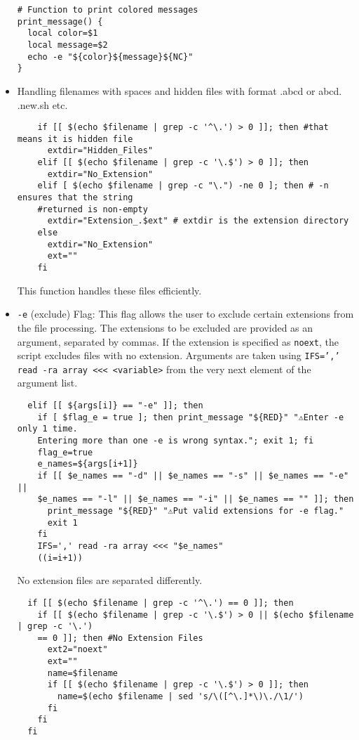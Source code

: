 \documentclass{article}
\begin{document}
\begin{itemize}
\begin{verbatim}
# Function to print colored messages
print_message() {
  local color=$1
  local message=$2
  echo -e "${color}${message}${NC}"
}
  \end{verbatim}
  \item Handling filenames with spaces and hidden files with format .abcd or abcd. .new.sh etc.
    \begin{verbatim}
    if [[ $(echo $filename | grep -c '^\.') > 0 ]]; then #that means it is hidden file
      extdir="Hidden_Files"
    elif [[ $(echo $filename | grep -c '\.$') > 0 ]]; then
      extdir="No_Extension"
    elif [ $(echo $filename | grep -c "\.") -ne 0 ]; then # -n ensures that the string
    #returned is non-empty
      extdir="Extension_.$ext" # extdir is the extension directory
    else
      extdir="No_Extension"
      ext=""
    fi
  \end{verbatim}
  This function handles these files efficiently.
  \item \texttt{-e} (exclude) Flag: This flag allows the user to exclude certain extensions from the file processing. The extensions to be excluded are provided as an argument, separated by commas. If the extension is specified as \texttt{noext}, the script excludes files with no extension.
  Arguments are taken using \texttt{IFS=',' read -ra array <<< <variable>} from the very next element of the argument list.
  \begin{verbatim}
  elif [[ ${args[i]} == "-e" ]]; then
    if [ $flag_e = true ]; then print_message "${RED}" "⚠️Enter -e only 1 time.
    Entering more than one -e is wrong syntax."; exit 1; fi
    flag_e=true
    e_names=${args[i+1]}
    if [[ $e_names == "-d" || $e_names == "-s" || $e_names == "-e" ||
    $e_names == "-l" || $e_names == "-i" || $e_names == "" ]]; then
      print_message "${RED}" "⚠️Put valid extensions for -e flag."
      exit 1
    fi
    IFS=',' read -ra array <<< "$e_names"
    ((i=i+1))
  \end{verbatim}
  No extension files are separated differently.
  \begin{verbatim}
  if [[ $(echo $filename | grep -c '^\.') == 0 ]]; then
    if [[ $(echo $filename | grep -c '\.$') > 0 || $(echo $filename | grep -c '\.')
    == 0 ]]; then #No Extension Files
      ext2="noext"
      ext=""
      name=$filename
      if [[ $(echo $filename | grep -c '\.$') > 0 ]]; then
        name=$(echo $filename | sed 's/\([^\.]*\)\./\1/')
      fi
    fi
  fi


\end{verbatim}
\end{itemize}
\end{document}
